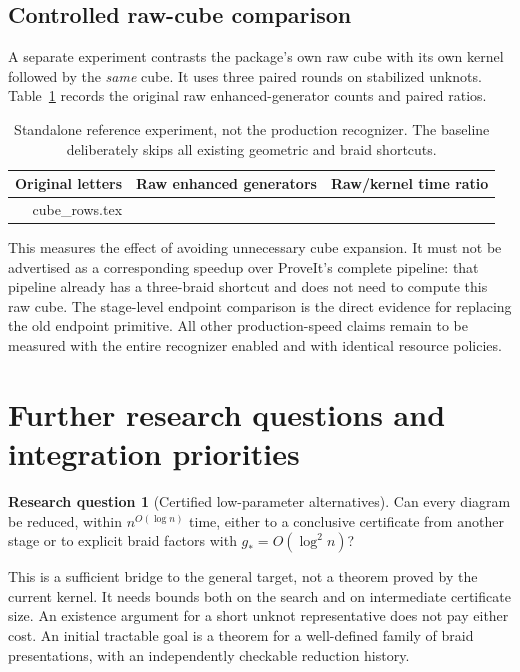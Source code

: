 \documentclass[11pt,letterpaper]{article}
\makeatletter
\theoremstyle{definition}
\newtheorem{question}{Research question}[section]
\let\tableinput\@@input
\makeatother
\begin{document}
\subsection{Controlled raw-cube comparison}
A separate experiment contrasts the package's own raw cube with its own kernel followed by the \emph{same} cube. It uses three paired rounds on stabilized unknots. Table~\ref{tab:cube} records the original raw enhanced-generator counts and paired ratios.

\begin{table}[htbp]
\centering
\caption{Standalone reference experiment, not the production recognizer. The baseline deliberately skips all existing geometric and braid shortcuts.}
\label{tab:cube}
\begin{tabular}{rrr}
\toprule
Original letters & Raw enhanced generators & Raw/kernel time ratio \\
\midrule
\tableinput cube_rows.tex 
\bottomrule
\end{tabular}
\end{table}

This measures the effect of avoiding unnecessary cube expansion. It must not be advertised as a corresponding speedup over ProveIt's complete pipeline: that pipeline already has a three-braid shortcut and does not need to compute this raw cube. The stage-level endpoint comparison is the direct evidence for replacing the old endpoint primitive. All other production-speed claims remain to be measured with the entire recognizer enabled and with identical resource policies.

\section{Further research questions and integration priorities}
\label{sec:research}

\begin{question}[Certified low-parameter alternatives]
Can every diagram be reduced, within $n^{O(\log n)}$ time, either to a conclusive certificate from another stage or to explicit braid factors with $g_*=O(\log^2 n)$?
\end{question}
This is a sufficient bridge to the general target, not a theorem proved by the current kernel. It needs bounds both on the search and on intermediate certificate size. An existence argument for a short unknot representative does not pay either cost. An initial tractable goal is a theorem for a well-defined family of braid presentations, with an independently checkable reduction history.
\end{document}
